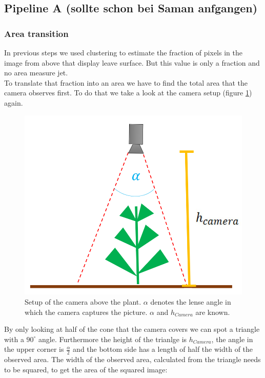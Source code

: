 \graphicspath{{members/tf/figures/}}

\subsection{Pipeline A (sollte schon bei Saman anfgangen)}

\subsubsection{Area transition}
In previous steps we used clustering to estimate the fraction of pixels in the image from above that display leave surface. But this value is only a fraction and no area measure jet.\\
To translate that fraction into an area we have to find the total area that the camera observes first. To do that we take a look at the camera setup (figure \ref{fig:setupAbove}) again.
   \begin{figure}[H]
       \centering
       \includegraphics[scale=0.6]{setupAbove.PNG}
       \caption{Setup of the camera above the plant. $\alpha$ denotes the lense angle in which the camera captures the picture. $\alpha$ and $h_{Camera}$ are known.}
       \label{fig:setupAbove}
   \end{figure}
By only looking at half of the cone that the camera covers we can spot a triangle with a $90^{\circ}$ angle. Furthermore the height of the trianlge is $h_{Camera}$, the angle in the upper corner is $\frac{\alpha}{2}$ and the bottom side has a length of half the width of the observed area. The width of the observed area, calculated from the triangle needs to be squared, to get the area of the squared image:\\
